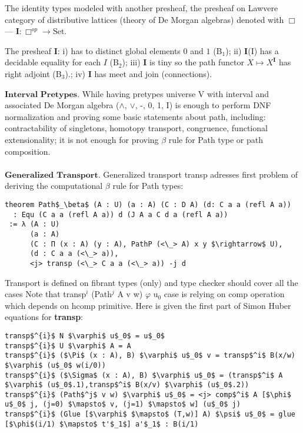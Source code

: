 \documentclass{article}
\begin{document}
\begin{definition}
The identity types modeled with another presheaf, the presheaf on Lawvere
category of distributive lattices (theory of De Morgan algebras) denoted
with $\Box$ — $\textbf{I} : \Box^{op} \rightarrow \textrm{Set}$.
\end{definition}

\begin{definition} The presheaf $\textbf{I}$:
i) has to distinct global elements $0$ and $1$ (B$_1$);
ii) $\textbf{I}$(I) has a decidable equality for each $I$ (B$_2$);
iii) $\textbf{I}$ is tiny so the path functor $X \mapsto X^\textbf{I}$ has right adjoint (B$_3$).;
iv) $\textbf{I}$ has meet and join (connections).
\end{definition}

$\textbf{Interval\ Pretypes}$. While having pretypes universe V with interval and
associated De Morgan algebra ($\wedge$, $\vee$, -, 0, 1, I) is enough to
perform DNF normalization and proving some basic statements about path, including:
contractability of singletons, homotopy transport, congruence, functional
extensionality; it is not enough for proving $\beta$ rule for Path type or path composition.
\\
\\
\indent $\textbf{Generalized\ Transport}$. Generalized transport transp adresses
first problem of deriving the computational $\beta$ rule for Path types:

\begin{lstlisting}[mathescape=true]
theorem Path$_\beta$ (A : U) (a : A) (C : D A) (d: C a a (refl A a))
  : Equ (C a a (refl A a)) d (J A a C d a (refl A a))
 := λ (A : U)
      (a : A)
      (C : П (x : A) (y : A), PathP (<\_> A) x y $\rightarrow$ U),
      (d : C a a (<\_> a)),
      <j> transp (<\_> C a a (<\_> a)) -j d
\end{lstlisting}

Transport is defined on fibrant types (only) and type checker should cover all the cases
Note that transp$^i$ (Path$^j$ A v w) $\varphi$ u$_0$ case is relying on comp
operation which depends on hcomp primitive. Here is given the first part of Simon Huber equations \cite{Huber} for \textbf{transp}:

\begin{lstlisting}[mathescape=true]
transp$^{i}$ N $\varphi$ u$_0$ = u$_0$
transp$^{i}$ U $\varphi$ A = A
transp$^{i}$ ($\Pi$ (x : A), B) $\varphi$ u$_0$ v = transp$^i$ B(x/w) $\varphi$ (u$_0$ w(i/0))
transp$^{i}$ ($\Sigma$ (x : A), B) $\varphi$ u$_0$ = (transp$^i$ A $\varphi$ (u$_0$.1),transp$^i$ B(x/v) $\varphi$ (u$_0$.2))
transp$^{i}$ (Path$^j$ v w) $\varphi$ u$_0$ = <j> comp$^i$ A [$\phi$ u$_0$ j, (j=0) $\mapsto$ v, (j=1) $\mapsto$ w] (u$_0$ j)
transp$^{i}$ (Glue [$\varphi$ $\mapsto$ (T,w)] A) $\psi$ u$_0$ = glue [$\phi$(i/1) $\mapsto$ t'$_1$] a'$_1$ : B(i/1)
\end{lstlisting}
\end{document}
